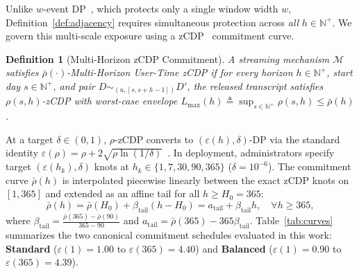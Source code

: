\documentclass[sigconf, nonacm]{acmart}
\newtheorem{definition}{Definition}
\begin{document}
Unlike $w$-event DP~\cite{kellaris2014wevent}, which protects only a single window width $w$, Definition~\ref{def:adjacency} requires simultaneous protection across \emph{all} $h \in \mathbb{N}^+$. We govern this multi-scale exposure using a zCDP~\cite{bun2016concentrated} commitment curve.

\begin{definition}[Multi-Horizon zCDP Commitment]
\label{def:curve}
A streaming mechanism $\mathcal{M}$ satisfies $\bar{\rho}(\cdot)$-Multi-Horizon User-Time zCDP if for every horizon $h \in \mathbb{N}^+$, start day $s \in \mathbb{N}^+$, and pair $D \sim_{(u, [s, s+h-1])} D'$, the released transcript satisfies $\rho(s, h)$-zCDP with worst-case envelope $L_{\max}(h) \triangleq \sup_{s \in \mathbb{N}^+} \rho(s, h) \le \bar{\rho}(h)$.
\end{definition}

At a target $\delta \in (0, 1)$, $\rho$-zCDP converts to $(\varepsilon(h), \delta)$-DP via the standard identity $\varepsilon(\rho) = \rho + 2\sqrt{\rho \ln(1/\delta)}$~\cite{bun2016concentrated}. In deployment, administrators specify target $(\varepsilon(h_k), \delta)$ knots at $h_k \in \{1, 7, 30, 90, 365\}$ ($\delta = 10^{-6}$). The commitment curve $\bar{\rho}(h)$ is interpolated piecewise linearly between the exact zCDP knots on $[1, 365]$ and extended as an affine tail for all $h \ge H_0 = 365$:
\begin{equation}
\label{eq:affine_tail}
\bar{\rho}(h) = \bar{\rho}(H_0) + \beta_{\mathrm{tail}}(h - H_0) = a_{\mathrm{tail}} + \beta_{\mathrm{tail}} h, \quad \forall h \ge 365,
\end{equation}
where $\beta_{\mathrm{tail}} = \frac{\bar{\rho}(365) - \bar{\rho}(90)}{365 - 90}$ and $a_{\mathrm{tail}} = \bar{\rho}(365) - 365\beta_{\mathrm{tail}}$. Table~\ref{tab:curves} summarizes the two canonical commitment schedules evaluated in this work: \textbf{Standard} ($\varepsilon(1)=1.00$ to $\varepsilon(365)=4.40$) and \textbf{Balanced} ($\varepsilon(1)=0.90$ to $\varepsilon(365)=4.39$).
\end{document}
